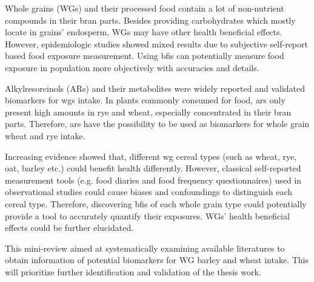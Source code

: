 Whole grains (WGs) and their processed food contain a lot of non-nutrient compounds in their bran parts. Besides providing carbohydrates which mostly locate in grains' endosperm, WGs may have other health beneficial effects. However, epidemiologic studies showed mixed results due to subjective self-report based food exposure measurement\cite{ISI:000447355100002}. Using \acrfull{bfis} can potentially measure food exposure in population more objectively with accuracies and details\cite{Scalbert2014}.

Alkylresorcinols (ARs) and their metabolites were widely reported and validated biomarkers for \acrshort{wgs} intake. 
In plants commonly consumed for food, \acrshort{ars} only present high amounts in rye and wheat, especially concentrated in their bran parts\cite{arreview2004}. Therefore, \acrshort{ars} have the possibility to be used as biomarkers for whole grain wheat and rye intake.

Increasing evidence showed that, different \acrshort{wg} cereal types (such as wheat, rye, oat, barley etc.) could benefit health differently. 
However, classical self-reported measurement tools (e.g. food diaries and food frequency questionnaires) used in observational studies could cause biases and confoundings to distinguish each cereal type.
Therefore, discovering \acrshort{bfis} of each whole grain type could potentially provide a tool to accurately quantify their exposures. WGs' health beneficial effects could be further elucidated. 

This mini-review aimed at systematically examining available literatures to obtain information of potential biomarkers for WG barley and wheat intake. This will prioritize further identification and validation of the thesis work.